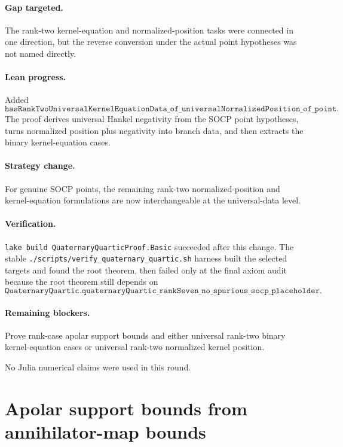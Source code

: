 \documentclass[11pt]{article}
\begin{document}
\paragraph{Gap targeted.}
The rank-two kernel-equation and normalized-position tasks were connected in
one direction, but the reverse conversion under the actual point hypotheses was
not named directly.

\paragraph{Lean progress.}
Added
\[
\texttt{hasRankTwoUniversalKernelEquationData\_of\_universalNormalizedPosition\_of\_point}.
\]
The proof derives universal Hankel negativity from the SOCP point hypotheses,
turns normalized position plus negativity into branch data, and then extracts
the binary kernel-equation cases.

\paragraph{Strategy change.}
For genuine SOCP points, the remaining rank-two normalized-position and
kernel-equation formulations are now interchangeable at the universal-data
level.

\paragraph{Verification.}
\texttt{lake build QuaternaryQuarticProof.Basic} succeeded after this change.
The stable \texttt{./scripts/verify\_quaternary\_quartic.sh} harness built the
selected targets and found the root theorem, then failed only at the final axiom
audit because the root theorem still depends on
\[
\texttt{QuaternaryQuartic.quaternaryQuartic\_rankSeven\_no\_spurious\_socp\_placeholder}.
\]

\paragraph{Remaining blockers.}
Prove rank-case apolar support bounds and either universal rank-two binary
kernel-equation cases or universal rank-two normalized kernel position.

No Julia numerical claims were used in this round.

\section*{Apolar support bounds from annihilator-map bounds}
\end{document}
